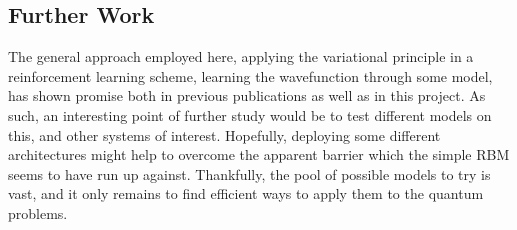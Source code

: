 \documentclass[a4paper, 11pt]{article}
\begin{document}
\begin{multicols}{2}
    \section{Further Work}
    The general approach employed here, applying the variational principle in a
    reinforcement learning scheme, learning the wavefunction through some model,
    has shown promise both in previous publications as well as in this project.
    As such, an interesting point of further study would be to test different
    models on this, and other systems of interest. Hopefully, deploying some
    different architectures might help to overcome the apparent barrier which
    the simple RBM seems to have run up against. Thankfully, the pool of
    possible models to try is vast, and it only remains to find efficient ways
    to apply them to the quantum problems.

    \printbibliography
\end{multicols}
\end{document}
